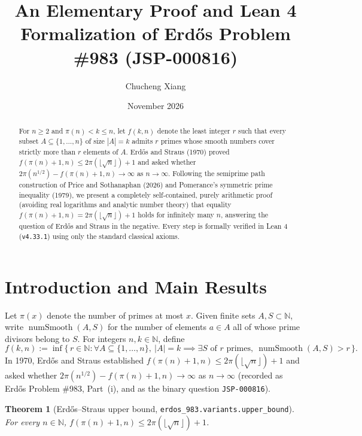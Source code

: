 \documentclass[11pt]{amsart}
\title[Formalization of Erd\H{o}s Problem \#983 (JSP-000816)]{An Elementary Proof and Lean 4 Formalization of Erd\H{o}s Problem \#983 (JSP-000816)}
\author{Chucheng Xiang}
\date{November 2026}
\newtheorem{theorem}{Theorem}
\begin{document}
\begin{abstract}
For $n \ge 2$ and $\pi(n) < k \le n$, let $f(k,n)$ denote the least integer $r$ such that every subset $A \subseteq \{1,\dots,n\}$ of size $|A| = k$ admits $r$ primes whose smooth numbers cover strictly more than $r$ elements of $A$. Erd\H{o}s and Straus (1970) proved $f(\pi(n)+1, n) \le 2\pi(\lfloor\sqrt{n}\rfloor) + 1$ and asked whether $2\pi(n^{1/2}) - f(\pi(n)+1, n) \to \infty$ as $n \to \infty$. Following the semiprime path construction of Price and Sothanaphan (2026) and Pomerance's symmetric prime inequality (1979), we present a completely self-contained, purely arithmetic proof (avoiding real logarithms and analytic number theory) that equality $f(\pi(n)+1, n) = 2\pi(\lfloor\sqrt{n}\rfloor) + 1$ holds for infinitely many $n$, answering the question of Erd\H{o}s and Straus in the negative. Every step is formally verified in Lean 4 (\texttt{v4.33.1}) using only the standard classical axioms.
\end{abstract}

\maketitle

\section{Introduction and Main Results}

Let $\pi(x)$ denote the number of primes at most $x$. Given finite sets $A, S \subset \mathbb{N}$, write $\operatorname{numSmooth}(A, S)$ for the number of elements $a \in A$ all of whose prime divisors belong to $S$. For integers $n, k \in \mathbb{N}$, define
\[
  f(k, n) := \inf\bigl\{\, r \in \mathbb{N} : \forall A \subseteq \{1,\dots,n\},\ |A|=k \implies \exists S \text{ of } r \text{ primes},\ \operatorname{numSmooth}(A,S) > r \,\bigr\}.
\]
In 1970, Erd\H{o}s and Straus \cite[pp.~138--140]{Er70b} established $f(\pi(n)+1,n) \le 2\pi(\lfloor\sqrt{n}\rfloor)+1$ and asked whether $2\pi(n^{1/2}) - f(\pi(n)+1,n) \to \infty$ as $n \to \infty$ (recorded as Erd\H{o}s Problem \#983, Part~(i), and as the binary question \texttt{JSP-000816}).

\begin{theorem}[Erd\H{o}s--Straus upper bound, \texttt{erdos\_983.variants.upper\_bound}]\label{thm:upper}
For every $n \in \mathbb{N}$, $f(\pi(n)+1, n) \le 2\pi(\lfloor\sqrt{n}\rfloor) + 1$.
\end{theorem}
\end{document}
